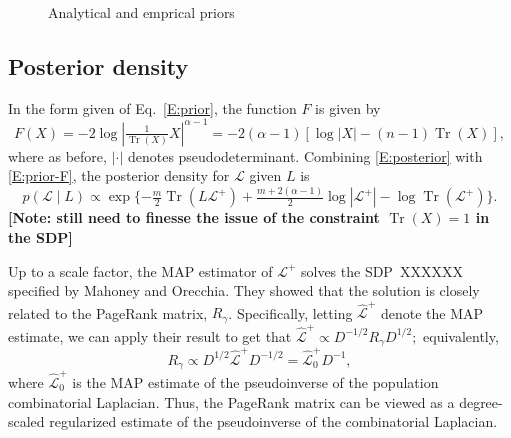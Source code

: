 \documentclass[12pt]{article}
\DeclareMathOperator*{\Tr}{Tr}
\theoremstyle{plain}
\begin{document}
\begin{figure}
{      
    }
    \caption{Analytical and emprical priors}
\end{figure}



\subsection{Posterior density}
\label{S:posterior-density}

In the form given of Eq.~\eqref{E:prior}, the function $F$ is given by
\begin{equation}\label{E:prior-F}
  F(X) = -2 \log |\tfrac{1}{\Tr(X)} X |^{\alpha - 1}
       = -2(\alpha - 1) [\log |X| - (n-1)\Tr(X)],
\end{equation}
where as before, $|\cdot|$ denotes pseudodeterminant.
Combining \eqref{E:posterior} with \eqref{E:prior-F}, the posterior
density for $\mathcal{L}$ given $L$ is
\[
  p(\mathcal{L} \mid L)
    \propto
      \exp\{
        -\tfrac{m}{2} \Tr(L \mathcal{L}^+)
        + \tfrac{m + 2(\alpha - 1)}{2} \log |\mathcal{L}^+ |
        - \log \Tr(\mathcal{L}^+)
        \}.
\]
\textbf{[Note: still need to finesse the issue of the constraint
  $\Tr(X) = 1$ in the SDP]}

Up to a scale factor, the MAP estimator of $\mathcal{L}^{+}$ solves
the SDP~XXXXXX specified by Mahoney and Orecchia.  They showed that
the solution is closely related to the PageRank matrix, $R_\gamma$.
Specifically, letting $\mathcal{\hat L}^{+}$ denote the MAP estimate,
we can apply their result to get that
\(
  \mathcal{\hat L}^+
    \propto D^{-1/2} R_\gamma D^{1/2};
\)
equivalently,
\[
  R_\gamma
    \propto
      D^{1/2} \mathcal{\hat L}^+ D^{-1/2}
    =
      \mathcal{\hat L}_0^+ D^{-1},
\]
where $\mathcal{\hat L}_0^+$ is the MAP estimate of the pseudoinverse
of the population combinatorial Laplacian.  Thus, the PageRank matrix
can be viewed as a degree-scaled regularized estimate of the
pseudoinverse of the combinatorial Laplacian.
\end{document}
